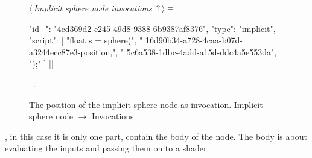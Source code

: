 \documentclass[%
    a4paper,    %
    justified,  %
    nobib,      %
    openany     %
]{tufte-book}
\makeatletter
\renewcommand{\label}[1]{\@tufte@label{##1}}%
\makeatother
\begin{document}
\begin{figure}
\begin{flushleft} \small
\begin{minipage}{\linewidth}\label{scrap103}\raggedright\small
{} $\langle\,${\itshape Implicit sphere node invocations}\nobreak\ {\footnotesize {?}}$\,\rangle\equiv$
\vspace{-1ex}
\begin{pythoncode}
{
    "id_": "4cd369d2-c245-49d8-9388-6b9387af8376",
    "type": "implicit",
    "script": [
        "float s = sphere(",
        "    16d90b34-a728-4caa-b07d-a3244ecc87e3-position,",
        "    5c6a538-1dbc-4add-a15d-ddc4a5e553da",
        ");"
    ]
}|\NWsep|
\end{pythoncode}
\vspace{1.5ex}
\footnotesize
\begin{list}{}{\setlength{\itemsep}{-\parsep}\setlength{\itemindent}{-\leftmargin}}
\item \NWtxtMacroRefIn\ .

\item{}
\end{list}
\end{minipage}\vspace{4ex}
\end{flushleft}
\caption{The position of the implicit sphere node as invocation.
  \newline{}\newline{}Implicit sphere node $\rightarrow$ Invocations}
\label{editor:lst:nodes:sphere-node:invocations:position}
\end{figure}

, in this case it is only one part, contain
the body of the node. The body is about evaluating the inputs and passing them
on to a shader.

\end{document}
